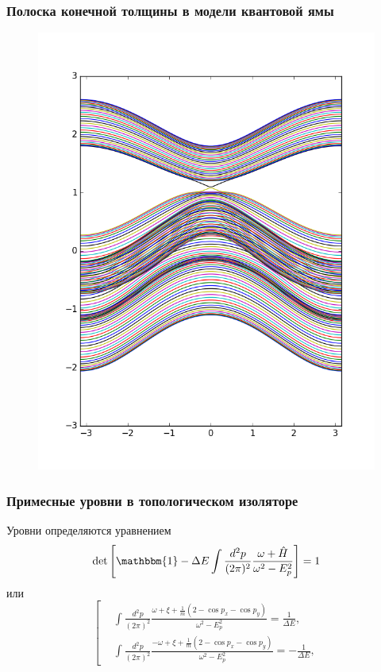 \documentclass{beamer}
\begin{document}
\begin{frame}
    \frametitle{Полоска конечной толщины в модели квантовой ямы}
    \begin{figure}
        \centering
        \includegraphics[height=0.9\textheight]{toy_ham_stripe.png}
    \end{figure}
\end{frame}
\begin{frame}
    \frametitle{Примесные уровни в топологическом изоляторе}
    Уровни определяются уравнением
    \begin{equation}    
        \det{\left[\mathbbm{1} - \Delta E \int \frac{d^2 p}{(2\pi)^2} 
                \frac{\omega + \hat{H}}{\omega^2 - E_p^2}\right]} = 1
    \end{equation}
    или
    \begin{equation}
        \label{integrals}
        \left[
        \begin{split}
            &\int \frac{d^2 p}{(2\pi)^2} 
                \frac{\omega + \xi + \frac{1}{m}(2 - \cos{p_x} - \cos{p_y})}
                     {\omega^2 - E_p^2} = \frac{1}{\Delta E},\\
            &\int \frac{d^2 p}{(2\pi)^2} 
                \frac{-\omega + \xi + \frac{1}{m}(2 - \cos{p_x} - \cos{p_y})}
                     {\omega^2 - E_p^2} = -\frac{1}{\Delta E},
        \end{split}
        \right.
    \end{equation}
\end{frame}
\end{document}
